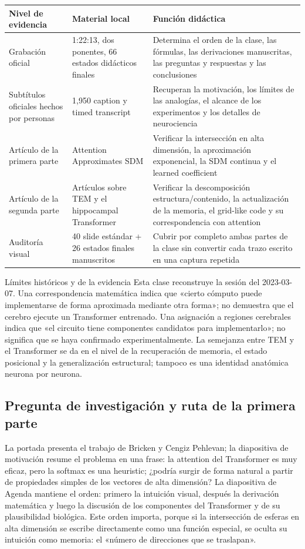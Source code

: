 \documentclass[a4paper]{article}
\begin{document}
\begin{longtable}{@{}L{0.18\textwidth}L{0.29\textwidth}L{0.41\textwidth}@{}}
\toprule
Nivel de evidencia & Material local & Función didáctica \\
\midrule
Grabación oficial & 1:22:13, dos ponentes, 66 estados didácticos finales & Determina el orden de la clase, las fórmulas, las derivaciones manuscritas, las preguntas y respuestas y las conclusiones \\
Subtítulos oficiales hechos por personas & 1,950 caption y timed transcript & Recuperan la motivación, los límites de las analogías, el alcance de los experimentos y los detalles de neurociencia \\
Artículo de la primera parte & Attention Approximates SDM & Verificar la intersección en alta dimensión, la aproximación exponencial, la SDM continua y el learned coefficient \\
Artículo de la segunda parte & Artículos sobre TEM y el hippocampal Transformer & Verificar la descomposición estructura/contenido, la actualización de la memoria, el grid-like code y su correspondencia con attention \\
Auditoría visual & 40 slide estándar + 26 estados finales manuscritos & Cubrir por completo ambas partes de la clase sin convertir cada trazo escrito en una captura repetida \\
\bottomrule
\end{longtable}

\begin{warningbox}{Límites históricos y de la evidencia}
Esta clase reconstruye la sesión del 2023-03-07. Una correspondencia matemática indica que «cierto cómputo puede implementarse de forma aproximada mediante otra forma»; no demuestra que el cerebro ejecute un Transformer entrenado. Una asignación a regiones cerebrales indica que «el circuito tiene componentes candidatos para implementarlo»; no significa que se haya confirmado experimentalmente. La semejanza entre TEM y el Transformer se da en el nivel de la recuperación de memoria, el estado posicional y la generalización estructural; tampoco es una identidad anatómica neurona por neurona.
\end{warningbox}

\subsection{Pregunta de investigación y ruta de la primera parte}

La portada presenta el trabajo de Bricken y Cengiz Pehlevan; la diapositiva de motivación resume el problema en una frase: la attention del Transformer es muy eficaz, pero la softmax es una heuristic; ¿podría surgir de forma natural a partir de propiedades simples de los vectores de alta dimensión? La diapositiva de Agenda mantiene el orden: primero la intuición visual, después la derivación matemática y luego la discusión de los componentes del Transformer y de su plausibilidad biológica. Este orden importa, porque si la intersección de esferas en alta dimensión se escribe directamente como una función especial, se oculta su intuición como memoria: el «número de direcciones que se traslapan».
\end{document}
